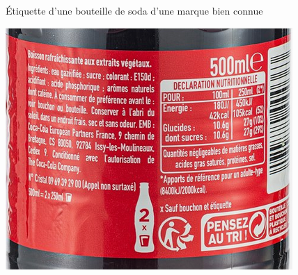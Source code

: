 \begin{doc}{\'{E}tiquette d'une bouteille de soda d'une marque bien connue}
\vspace{-0.4cm}
  \label{doc:Coca}
  \begin{center}
     \includegraphics[scale=2]{Images/Etiquette_coca.png}
  \end{center}
\end{doc}
 
\newpage

